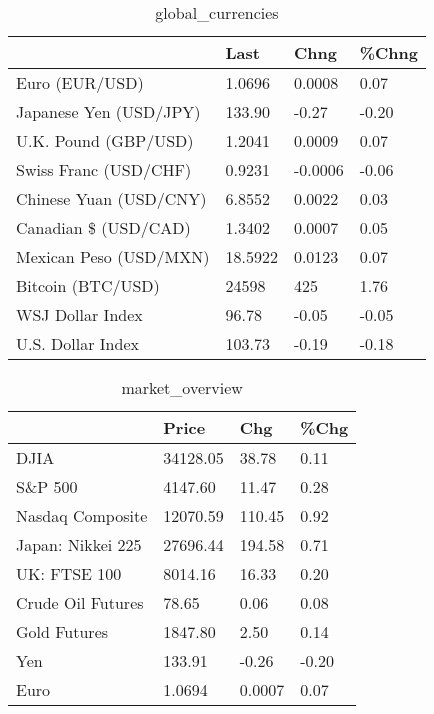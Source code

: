 \documentclass{article}%
\begin{document}
%


\begin{table}[htbp]%
\caption{global\_currencies}%
\centering%
\begin{adjustbox}{width=1\textwidth}%
\begin{tabular}{llll}
\toprule
                       &    Last &    Chng & \%Chng \\
\midrule
        Euro (EUR/USD) &  1.0696 &  0.0008 &  0.07 \\
Japanese Yen (USD/JPY) &  133.90 &   -0.27 & -0.20 \\
  U.K. Pound (GBP/USD) &  1.2041 &  0.0009 &  0.07 \\
 Swiss Franc (USD/CHF) &  0.9231 & -0.0006 & -0.06 \\
Chinese Yuan (USD/CNY) &  6.8552 &  0.0022 &  0.03 \\
  Canadian \$ (USD/CAD) &  1.3402 &  0.0007 &  0.05 \\
Mexican Peso (USD/MXN) & 18.5922 &  0.0123 &  0.07 \\
     Bitcoin (BTC/USD) &   24598 &     425 &  1.76 \\
      WSJ Dollar Index &   96.78 &   -0.05 & -0.05 \\
     U.S. Dollar Index &  103.73 &   -0.19 & -0.18 \\
\bottomrule
\end{tabular}
%
\end{adjustbox}%
\end{table}

%


\begin{table}[htbp]%
\caption{market\_overview}%
\centering%
\begin{adjustbox}{width=1\textwidth}%
\begin{tabular}{llll}
\toprule
                  &    Price &    Chg &  \%Chg \\
\midrule
             DJIA & 34128.05 &  38.78 &  0.11 \\
          S\&P 500 &  4147.60 &  11.47 &  0.28 \\
 Nasdaq Composite & 12070.59 & 110.45 &  0.92 \\
Japan: Nikkei 225 & 27696.44 & 194.58 &  0.71 \\
     UK: FTSE 100 &  8014.16 &  16.33 &  0.20 \\
Crude Oil Futures &    78.65 &   0.06 &  0.08 \\
     Gold Futures &  1847.80 &   2.50 &  0.14 \\
              Yen &   133.91 &  -0.26 & -0.20 \\
             Euro &   1.0694 & 0.0007 &  0.07 \\
\bottomrule
\end{tabular}
%
\end{adjustbox}%
\end{table}

%
\end{document}
